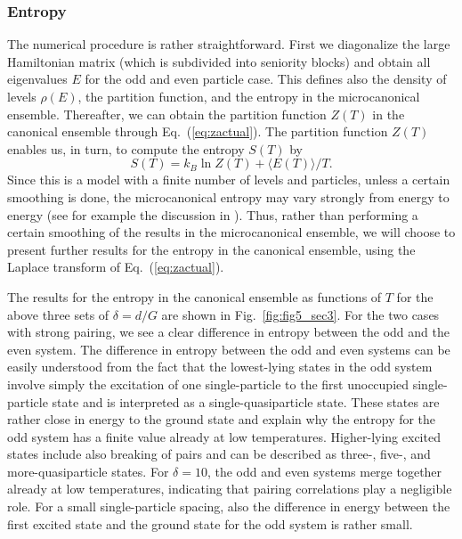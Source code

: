 \documentclass[rmp,aps,floatfix]{revtex4}
\begin{document}
\subsubsection{Entropy}

The numerical procedure is rather straightforward. 
First we diagonalize the large Hamiltonian matrix (which is 
subdivided into seniority blocks) and obtain all 
eigenvalues $E$ for the odd and even particle case. This defines also 
the density of levels $\rho(E)$, the partition function, and 
the entropy in the microcanonical ensemble. Thereafter, we can 
obtain the partition function $Z(T)$ in the canonical ensemble through 
Eq.\ (\ref{eq:zactual}). The partition function 
$Z(T)$ enables us, in turn, to compute the entropy $S(T)$ by
\begin{equation}
    S(T)=k_B \ln Z(T)+\langle E(T)\rangle/T.
    \label{eq:canentropy}
\end{equation}
Since this is a model with a finite number of levels and 
particles, unless a certain smoothing is done, 
the microcanonical entropy may vary strongly from energy to energy
(see for example the discussion in \cite{entropy2000}).
Thus, rather than performing a 
certain smoothing of the results in the microcanonical ensemble, 
we will choose to present further results 
for the entropy in the canonical ensemble, using the 
Laplace transform of Eq.\ (\ref{eq:zactual}). 

The results for the entropy in the canonical ensemble 
as functions of $T$ for the above three sets of 
$\delta=d/G$ are shown in Fig.\ \ref{fig:fig5_sec3}. For the two 
cases with strong pairing, we see a clear difference in entropy 
between the odd and the even system. The difference in 
entropy between the odd and even systems can be easily 
understood from the fact that the lowest-lying states in 
the odd system involve simply the excitation of one single-particle 
to the first unoccupied single-particle state and is 
interpreted as a single-quasiparticle state. These states are 
rather close in energy to the ground state and explain 
why the entropy for the odd system has a finite value 
already at low temperatures. Higher-lying excited 
states include also breaking of pairs and can be 
described as three-, five-, and more-quasiparticle states. 
For $\delta=10$, the odd and even systems 
merge together already at low temperatures, indicating that 
pairing correlations play a negligible role. For a small single-particle 
spacing, also the difference in energy between the first 
excited state and the ground state for the odd system is rather small. 
\end{document}
